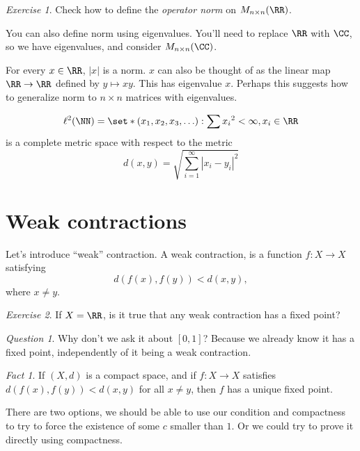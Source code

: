 \documentclass{article}
\theoremstyle{remark}
\newtheorem*{question}{Question}
\newtheorem*{fact}{Fact}
\newtheorem{exercise}{Exercise}
\begin{document}
\begin{exercise}
    Check how to define the \emph{operator norm} on $M_{n\times n}(\RR)$.
\end{exercise}

You can also define norm using eigenvalues. You'll need to replace
$\RR$ with $\CC$, so we have eigenvalues, and consider
$M_{n\times n}(\CC)$.

For every $x\in \RR$, $|x|$ is a norm. $x$ can also be thought of
as the linear map $\RR\to\RR$ defined by $y\mapsto xy$. This
has eigenvalue $x$. Perhaps this suggests how to generalize
norm to $n\times n$ matrices with eigenvalues.

\begin{definition}
    \[ \ell^2(\NN) = \set*{(x_1,x_2,x_3,\ldots) : \sum {x_i}^2 < \infty, x_i\in\RR}\]
    is a complete metric space with respect to the metric
    \[ d(x,y) = \sqrt{\sum_{i=1}^\infty |x_i-y_i|^2} \]
\end{definition}

\section{Weak contractions}

Let's introduce ``weak'' contraction. A weak contraction, is
a function $f:X\to X$ satisfying
\[ d(f(x),f(y))<d(x,y), \]
where $x\ne y$.

\begin{exercise}
    If $X=\RR$, is it true that any weak contraction has a
    fixed point?
\end{exercise}

\begin{question}
    Why don't we ask it about $[0,1]$? Because we already know
    it has a fixed point, independently of it being a weak
    contraction.
\end{question}

\begin{fact}
    If $(X,d)$ is a compact space, and if $f:X\to X$
    satisfies $d(f(x),f(y)) < d(x,y)$ for all $x\ne y$, then
    $f$ has a unique fixed point.
\end{fact}

There are two options, we should be able to use our condition
and compactness to try to force the existence of 
some $c$ smaller than $1$. Or 
we could try to prove it directly using compactness.
\end{document}
